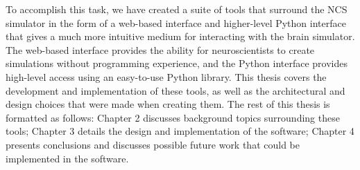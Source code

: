 To accomplish this task, we have created a suite of tools that surround the NCS simulator in the form of a web-based interface and higher-level Python interface that gives a much more intuitive medium for interacting with the brain simulator. The web-based interface provides the ability for neuroscientists to create simulations without programming experience, and the Python interface provides high-level access using an easy-to-use Python library. This thesis covers the development and implementation of these tools, as well as the architectural and design choices that were made when creating them. The rest of this thesis is formatted as follows: Chapter 2 discusses background topics surrounding these tools; Chapter 3 details the design and implementation of the software; Chapter 4 presents conclusions and discusses possible future work that could be implemented in the software.